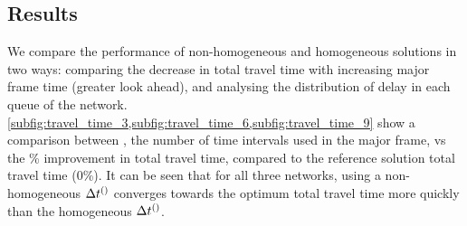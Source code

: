 
\subsection{Results}

We compare the performance of non-homogeneous and homogeneous solutions in two
ways: comparing the decrease in total travel time with increasing major frame
time (greater look ahead), and analysing the distribution of delay in each queue
of the network.
\cref{subfig:travel_time_3,subfig:travel_time_6,subfig:travel_time_9} show a
comparison between \Nn, the number of time intervals  used in the major frame, vs the
\% improvement in total travel time,  compared to the reference solution total
travel time (0\%). It can be seen that for all three networks, using a non-homogeneous
$\DT[]$ converges towards the optimum total travel time more quickly than the
homogeneous $\DT[]$. 

